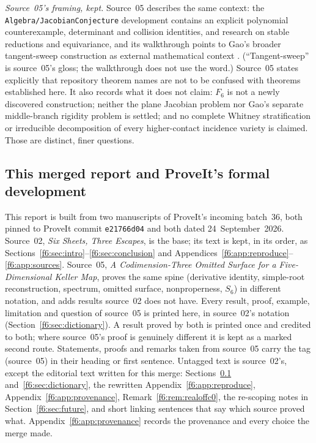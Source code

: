 \documentclass[11pt,a4paper]{article}
\theoremstyle{definition}
\newcommand{\code}[1]{\texttt{\nolinkurl{#1}}}
\newcommand{\src}[1]{\textup{(source~#1)}}
\begin{document}
\emph{Source~05's framing, kept.} Source~05 describes the same context: the
\code{Algebra/JacobianConjecture} development contains an explicit polynomial
counterexample, determinant and collision identities, and research on stable
reductions and equivariance, and its walkthrough points to Gao's broader
tangent-sweep construction as external mathematical context
\cite{ProveIt,ProveItWalkthrough}. (``Tangent-sweep'' is source~05's gloss;
the walkthrough does not use the word.) Source~05 states explicitly that
repository theorem names are not to be confused with theorems established
here. It also records what it does not claim: $F_6$ is not a newly
discovered construction; neither the plane Jacobian problem nor Gao's
separate middle-branch rigidity problem is settled; and no complete Whitney
stratification or irreducible decomposition of every higher-contact
incidence variety is claimed. Those are distinct, finer questions.

\subsection{This merged report and ProveIt's formal development}
\label{f6:sec:merge}
This report is built from two manuscripts of ProveIt's incoming batch~36,
both pinned to ProveIt commit \code{e21766d04} and both dated
24~September~2026. Source~02, \emph{Six Sheets, Three Escapes}, is the base;
its text is kept, in its order, as Sections~\ref{f6:sec:intro}--\ref{f6:sec:conclusion}
and Appendices~\ref{f6:app:reproduce}--\ref{f6:app:sources}. Source~05,
\emph{A Codimension-Three Omitted Surface for a Five-Dimensional Keller Map},
proves the same spine (derivative identity, simple-root reconstruction,
spectrum, omitted surface, nonproperness, $S_6$) in different notation, and
adds results source~02 does not have. Every result, proof, example,
limitation and question of source~05 is printed here, in source~02's
notation (Section~\ref{f6:sec:dictionary}). A result proved by both is
printed once and credited to both; where source~05's proof is genuinely
different it is kept as a marked second route. Statements, proofs and
remarks taken from source~05 carry the tag \src{05} in their heading or
first sentence. Untagged text is source~02's, except the editorial text
written for this merge: Sections~\ref{f6:sec:merge} and~\ref{f6:sec:dictionary},
the rewritten Appendix~\ref{f6:app:reproduce}, Appendix~\ref{f6:app:provenance},
Remark~\ref{f6:rem:realoffc0},
the re-scoping notes in Section~\ref{f6:sec:future}, and short linking
sentences that say which source proved what.
Appendix~\ref{f6:app:provenance} records the provenance and every choice the
merge made.
\end{document}
